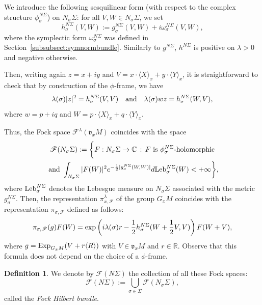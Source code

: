 \documentclass[12pt,a4paper]{amsart}
\theoremstyle{plain}
\theoremstyle{definition}
\newtheorem{definition}[theorem]{Definition}
\theoremstyle{remark}
\numberwithin{equation}{section}
\theoremstyle{definition}
\def\R{{\mathbb R}}%
\def\C{{\mathbb C}}%
\def \Exp{{\rm Exp}}
\def \exp{{\rm exp}}
\numberwithin{equation}{section}
\begin{document}
We introduce the following sesquilinear form (with respect to the complex structure $\phi_\sigma^{N\Sigma}$) on $N_\sigma \Sigma$: for all $V,W\in N_\sigma \Sigma$, we set
\begin{equation*}
    h_\sigma^{N\Sigma}(V,W) := g_\sigma^{N\Sigma}(V,W) + i \omega_\sigma^{N\Sigma}(V,W),
\end{equation*}
where the symplectic form $\omega_\sigma^{N\Sigma}$ was defined in Section~\ref{subsubsect:symnormbundle}.
Similarly to $g^{N\Sigma}$, $h^{N\Sigma}$ is positive on $\lambda >0$ and negative otherwise. 

Then, writing again $z = x+iy$ and $V = x\cdot\langle X\rangle_x + y\cdot \langle Y\rangle_x$, it is straightforward to check that by construction of the $\phi$-frame, we have 
\begin{equation*}
    \lambda(\sigma)|z|^2 = h_\sigma^{N\Sigma}(V,V) \quad\mbox{and}\quad \lambda(\sigma) w \Bar{z}  = h_\sigma^{N\Sigma}(W,V),
\end{equation*}
where $w = p+iq$ and $W =p\cdot\langle X\rangle_x + q\cdot \langle Y\rangle_x$.

Thus, the Fock space $\mathscr{F}^\lambda(\mathfrak{v}_x M)$ coincides with the space
\begin{multline*}
    \mathscr{F}(N_\sigma \Sigma) := \biggl\{F:N_\sigma\Sigma\rightarrow\C\,:\, F\ \mbox{is}\ \phi_\sigma^{N\Sigma}\mbox{-holomorphic}\\ \mbox{ and }\int_{N_\sigma\Sigma} |F(W)|^2 e^{-\frac{1}{2}|g_\sigma^{N\Sigma}(W,W)|}d{\rm Leb}_\sigma^{N\Sigma}(W) < +\infty\biggr\},
\end{multline*}
where ${\rm Leb}_\sigma^{N\Sigma}$ denotes the Lebesgue measure on $N_\sigma\Sigma$ associated with the metric $g_\sigma^{N\Sigma}$. Then, the representation $\pi_{x,\mathscr{F}}^\lambda$ of the group $G_x M$ coincides with the representation $\pi_{\sigma,\mathscr{F}}$ defined as follows:
\begin{equation}
    \label{eq:repfocktgtgroup}
    \pi_{\sigma,\mathscr{F}}(g) F(W) = \exp\left(i\lambda(\sigma) r - \frac{1}{2}h_\sigma^{N\Sigma}(W+\frac{1}{2}V,V)\right) F(W + V),
\end{equation}
where $g = \Exp_{G_x M} (V+ r\langle R\rangle)$ with $V\in \mathfrak{v}_x M$ and $r\in\R$. Observe that this formula does not depend on the choice of a $\phi$-frame.

\begin{definition}
    We denote by $\mathscr{F}(N\Sigma)$ the collection of all these Fock spaces:
    \begin{equation*}
        \mathscr{F}(N\Sigma) := \bigcup_{\sigma\in\Sigma}\mathscr{F}(N_\sigma \Sigma),
    \end{equation*}
    called the \emph{Fock Hilbert bundle}.
\end{definition}
\end{document}
